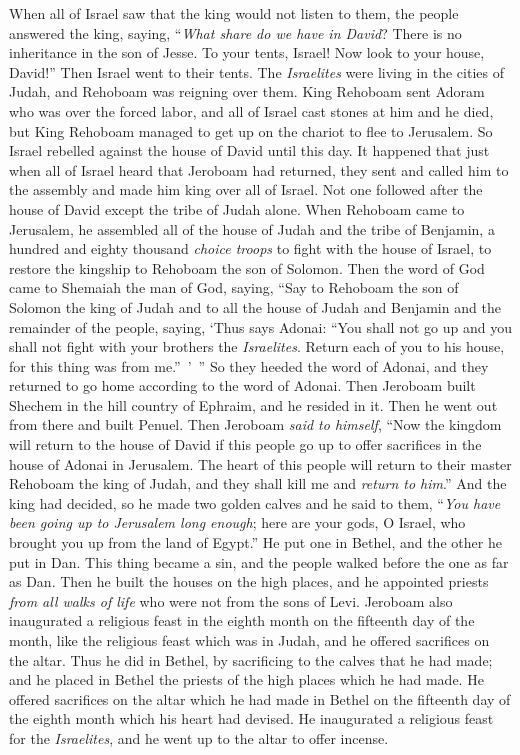 \begin{biblechapter}
\verse When all of Israel saw that the king would not listen to them, the people answered the king, saying, “\textit{What share do we have in David}? There is no inheritance in the son of Jesse. To your tents, Israel! Now look to your house, David!” Then Israel went to their tents.
\verse The \textit{Israelites} were living in the cities of Judah, and Rehoboam was reigning over them.
\verse King Rehoboam sent Adoram who was over the forced labor, and all of Israel cast stones at him and he died, but King Rehoboam managed to get up on the chariot to flee to Jerusalem.
\verse So Israel rebelled against the house of David until this day.
 It happened that just when all of Israel heard that Jeroboam had returned, they sent and called him to the assembly and made him king over all of Israel. Not one followed after the house of David except the tribe of Judah alone.
\verse When Rehoboam came to Jerusalem, he assembled all of the house of Judah and the tribe of Benjamin, a hundred and eighty thousand \textit{choice troops} to fight with the house of Israel, to restore the kingship to Rehoboam the son of Solomon.
\verse Then the word of God came to Shemaiah the man of God, saying,
\verse “Say to Rehoboam the son of Solomon the king of Judah and to all the house of Judah and Benjamin and the remainder of the people, saying,
\verse ‘Thus says Adonai: “You shall not go up and you shall not fight with your brothers the \textit{Israelites}. Return each of you to his house, for this thing was from me.” ’ ” So they heeded the word of Adonai, and they returned to go home according to the word of Adonai.
 Then Jeroboam built Shechem in the hill country of Ephraim, and he resided in it. Then he went out from there and built Penuel.
\verse Then Jeroboam \textit{said to himself}, “Now the kingdom will return to the house of David
\verse if this people go up to offer sacrifices in the house of Adonai in Jerusalem. The heart of this people will return to their master Rehoboam the king of Judah, and they shall kill me and \textit{return to him}.”
\verse And the king had decided, so he made two golden calves and he said to them, “\textit{You have been going up to Jerusalem long enough}; here are your gods, O Israel, who brought you up from the land of Egypt.”
\verse He put one in Bethel, and the other he put in Dan.
\verse This thing became a sin, and the people walked before the one as far as Dan.
\verse Then he built the houses on the high places, and he appointed priests \textit{from all walks of life} who were not from the sons of Levi.
\verse Jeroboam also inaugurated a religious feast in the eighth month on the fifteenth day of the month, like the religious feast which was in Judah, and he offered sacrifices on the altar. Thus he did in Bethel, by sacrificing to the calves that he had made; and he placed in Bethel the priests of the high places which he had made.
\verse He offered sacrifices on the altar which he had made in Bethel on the fifteenth day of the eighth month which his heart had devised. He inaugurated a religious feast for the \textit{Israelites}, and he went up to the altar to offer incense.
\end{biblechapter}


